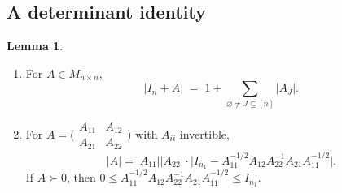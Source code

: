 \documentclass[14pt]{extarticle}
\theoremstyle{definition}
\newtheorem{lemma}[theorem]{Lemma}
\begin{document}
\subsection{A determinant identity}

\begin{lemma}\label{lem:det}
  \leavevmode
  \begin{enumerate}[label=(\roman*),nosep]
    \item For $A\in M_{n\times n}$,
    \begin{equation}\label{eq:det1}
      |I_n+A|\;=\;1+\sum_{\varnothing\ne J\subseteq[n]}|A_J|.
    \end{equation}
    \item For $A=\bigl(\begin{smallmatrix}A_{11}&A_{12}\\A_{21}&A_{22}
      \end{smallmatrix}\bigr)$ with $A_{ii}$ invertible,
    \begin{equation}\label{eq:det2}
      |A|=|A_{11}||A_{22}|\cdot
      \bigl|I_{n_1}-A_{11}^{-1/2}A_{12}A_{22}^{-1}A_{21}A_{11}^{-1/2}\bigr|.
    \end{equation}
    If $A\succ 0$, then $0\leqslant A_{11}^{-1/2}A_{12}A_{22}^{-1}A_{21}
    A_{11}^{-1/2}\leqslant I_{n_1}$.
  \end{enumerate}
\end{lemma}
\end{document}
